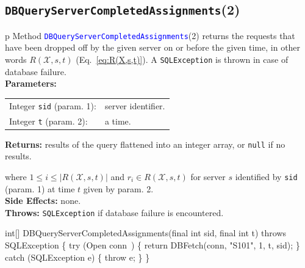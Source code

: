 \subsection{{\tt{}\protect{}DBQueryServerCompletedAssignments}(2)}
\begin{tabular}{p{\textwidth}}
\toprule
{}
Method \textcolor{blue}{{\tt{}\protect{}DBQueryServerCompletedAssignments}}(2) returns the
requests that have been dropped off by the given server on or before the given time,
in other words $R(\mathcal{X},s,t)$ (Eq.~\ref{eq:R(X,s,t)}).
A {\tt{}SQLException} is thrown in case of database failure.\\
\midrule
\textbf{Parameters:} \\
\begin{tabular}{lp{116mm}}
Integer {\tt{}sid} (param. 1):&server identifier.\\
Integer {\tt{}t} (param. 2):&a time.\\
\end{tabular}
\textbf{Returns:} results of the query flattened into an integer array,
or {\tt{}null} if no results.


where $1\leq i\leq |R(\mathcal{X},s,t)|$ and
$r_i\in R(\mathcal{X},s,t)$ for server $s$ identified by {\tt{}sid} (param. 1)
at time $t$ given by param. 2.\\
\textbf{Side Effects:} none.\\
\textbf{Throws:} {\tt{}SQLException} if database failure is encountered.\\
\bottomrule
\end{tabular}
\nwenddocs{}\endmoddef{}
int[] DBQueryServerCompletedAssignments(final int sid, final int t)
throws SQLException \{
  try (\LA{}Open \code{}conn\edoc{}~{\nwtagstyle{}}\RA{}) \{
    return DBFetch(conn, "S101", 1, t, sid);
  \} catch (SQLException e) \{
    throw e;
  \}
\}
\eatline
{}\nwendcode{}\nwdocspar
